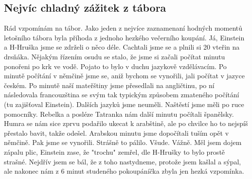 \subsection*{Nejvíc chladný zážitek z tábora} %
\label{sub:nejvíc_chladný_zážitek_z_tábora}



Rád vzpomínám na tábor. Jako jeden z nejvíce zaznamenaní hodných momentů letošního tábora byla příhoda z jednoho hezkého večerního koupání. Já, Einstein a H-Hruška jsme se zdrželi o něco déle. Cachtali jsme se a plnili si 20 vteřin na drsňáka. Nějakým řízením osudu se stalo, že jsme si začali počítat minutu ponořeni po krk ve vodě. Pojato to bylo v duchu jazykově vzdělávacím. Po minutě počítání v němčině jsme se, aniž bychom se vynořili, jali počítat v jazyce českém. Po minutě naší mateřštiny jsme přesedlali na angličtinu, po ní následovala francouzština se svým tak typickým způsobem zmateného počítání (tu zajišťoval Einstein). Dalších jazyků jsme neuměli. Naštěstí jsme měli po ruce pomocníky. Rebelka a posléze Tatranka nám další minutu počítali španělsky. Humra se nám sice zprvu podařilo ukecat k arabštině, ale po chvilce ho to nejspíš přestalo bavit, takže odešel. Arabskou minutu jsme dopočítali tuším opět v němčině. Pak jsme se vynořili. Strášně to pálilo. Všude. Vážně. Měl jsem dojem zápalu plic, Einstein zase, že "trochu" zemřel, dle H-Hrušky to bylo prostě strašné. Nejdřív jsem se bál, že z toho nastydneme, protože jsem kašlal a sýpal, ale nakonec nám z 6 minut studeného pokoupáníčka zbyla jen hezká vzpomínka. 
